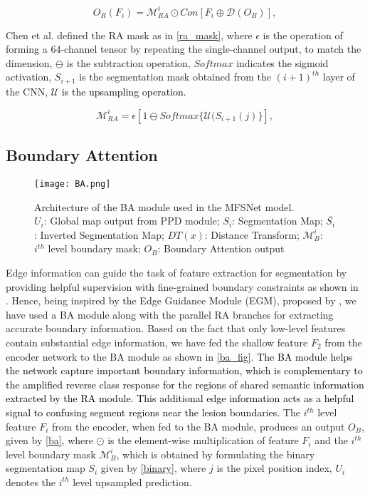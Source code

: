 \documentclass[review]{elsarticle}
\begin{document}
\begin{equation}\label{eqra}
    O_{R}(F_i)=\mathcal{M}_{RA}^i\odot Con[F_i\oplus \mathcal{D}(O_B)],
\end{equation}

Chen et al. \cite{chen2018reverse} defined the RA mask as in \autoref{ra_mask}, where $\epsilon$ is the operation of forming a 64-channel tensor by repeating the single-channel output, to match the dimension, $\ominus$ is the subtraction operation, $Softmax$ indicates the sigmoid activation, $S_{i+1}$ is the segmentation mask obtained from the $(i+1)^{th}$ layer of the CNN, \textcolor{black}{$\mathcal{U}$ is the upsampling operation.}

\begin{equation}\label{ra_mask}
    \mathcal{M}_{RA}^i=\epsilon[1\ominus Softmax\{\mathcal{U}(S_{i+1}(j)\}],
\end{equation}


\subsection{Boundary Attention}\label{boundary}

\begin{figure*}
    \centering
\texttt{[image: BA.png]}
\caption{Architecture of the BA module used in the MFSNet model.\\ $U_i$: Global map output from PPD module; $S_i$: Segmentation Map; $\bar{S_i}$: Inverted Segmentation Map; $DT(x)$: Distance Transform; $\mathcal{M}_B^i$: $i^{th}$ level boundary mask; $O_B$: Boundary Attention output}
    \label{ba_fig}
\end{figure*}

Edge information can guide the task of feature extraction for segmentation by providing helpful supervision with fine-grained boundary constraints as shown in \cite{zhao2019egnet}. Hence, being inspired by the Edge Guidance Module (EGM), proposed by \cite{zhang2019net}, we have used a BA module along with the parallel RA branches for extracting accurate boundary information. Based on the fact that only low-level features contain substantial edge information, we have fed the shallow feature $F_2$ from the encoder network to the BA module as shown in \autoref{ba_fig}. \textcolor{black}{The BA module helps the network capture important boundary information, which is complementary to the amplified reverse class response for the regions of shared semantic information extracted by the RA module. This additional edge information acts as a helpful signal to confusing segment regions near the lesion boundaries.} The $i^{th}$ level feature $F_i$ from the encoder, when fed to the BA module, produces an output $O_B$, given by \autoref{ba}, where $\odot$ is the element-wise multiplication of feature $F_i$ and the $i^{th}$ level boundary mask $\mathcal{M}_B^i$, which is obtained by formulating the binary segmentation map $S_i$ given by \autoref{binary}, where $j$ is the pixel position index, $U_i$ denotes the $i^{th}$ level upsampled prediction.
\end{document}
